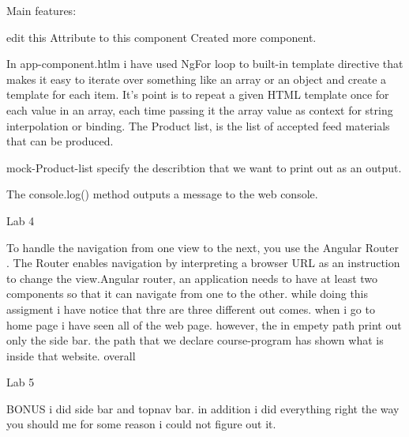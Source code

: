 Main features:

edit this Attribute to this component Created more component.

In app-component.htlm  i have used NgFor loop to built-in template directive that makes it easy to iterate over something like an array or an object and create a template for each item.
It's point is to repeat a given HTML template once for each value in an array, each time passing it the array value as context for string interpolation or binding.
The Product list, is the list of accepted feed materials
that can be produced.

mock-Product-list specify the describtion that we want to print out as an output.

The console.log() method outputs a message to the web console. 





Lab 4

To handle the navigation from one view to the next, you use the Angular Router . The Router enables navigation by interpreting a browser URL as an instruction to change the view.Angular router, an application needs to have at least two components so that it can navigate from one to the other. while doing this assigment i have notice that thre are three different  out comes.
when i go to home page i have seen all of the web page. however, the in empety path print out only the side bar. the path that we declare course-program has shown what is inside that website.
overall 



Lab 5


BONUS i did side bar and topnav bar. in addition i did everything right the way you should me for some reason i could not figure out it.